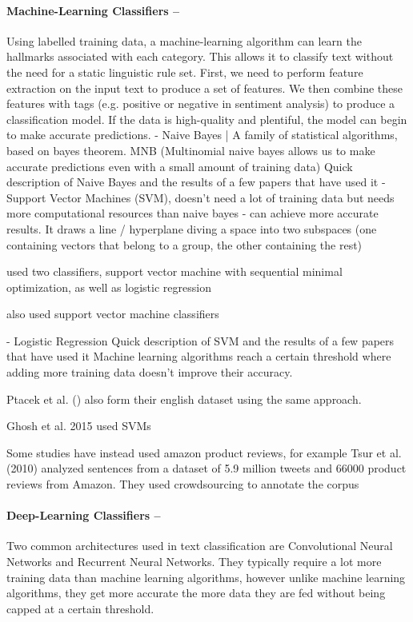 \documentclass[12pt,a4paper]{article}
\begin{document}
\paragraph{Machine-Learning Classifiers --}
Using labelled training data, a machine-learning algorithm can learn the hallmarks associated with each category. This allows it to classify text without the need for a static linguistic rule set. First, we need to perform feature extraction on the input text to produce a set of features. We then combine these features with tags (e.g. positive or negative in sentiment analysis) to produce a classification model. If the data is high-quality and plentiful, the model can begin to make accurate predictions.
- Naive Bayes | A family of statistical algorithms, based on bayes theorem. MNB (Multinomial naive bayes allows us to make accurate predictions even with a small amount of training data)
Quick description of Naive Bayes and the results of a few papers that have used it
- Support Vector Machines (SVM), doesn't need a lot of training data but needs more computational resources than naive bayes - can achieve more accurate results. It draws a line / hyperplane diving a space into two subspaces (one containing vectors that belong to a group, the other containing the rest)

\cite{gonzalez2011identifying} used two classifiers, support vector machine with sequential minimal optimization, as well as logistic regression

\cite{ptavcek2014sarcasm} also used support vector machine classifiers
 
- Logistic Regression
Quick description of SVM and the results of a few papers that have used it
Machine learning algorithms reach a certain threshold where adding more training data doesn't improve their accuracy.


Ptacek et al. () also form their english dataset using the same approach.

Ghosh et al. 2015 used SVMs


Some studies have instead used amazon product reviews, for example Tsur et al. (2010) analyzed sentences from a dataset of 5.9 million tweets and 66000 product reviews from Amazon. They used crowdsourcing to annotate the corpus



\paragraph{Deep-Learning Classifiers --}
Two common architectures used in text classification are Convolutional Neural Networks and Recurrent Neural Networks. They typically require a lot more training data than machine learning algorithms, however unlike machine learning algorithms, they get more accurate the more data they are fed without being capped at a certain threshold.
\end{document}
